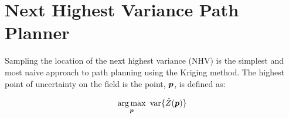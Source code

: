 






\section{Next Highest Variance Path Planner} \label{sec:nhvpp}
Sampling the location of the next highest variance (NHV) is the simplest and most naive approach to path planning using the Kriging method. The highest point of uncertainty on the field is the point, ${\it{\boldsymbol{p}}}$, is defined as:

\begin{equation}
\argmax_{\vect{p}} \ \text{var}\{\hat{Z}(\vect{p})\}
\end{equation}

